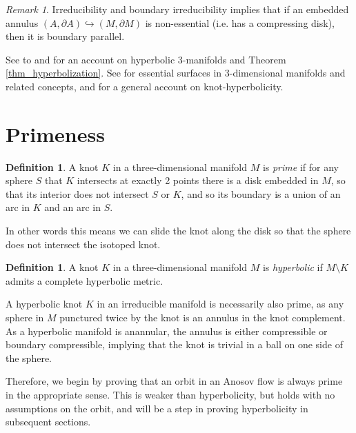 \documentclass[12pt]{amsart}
\theoremstyle{definition}
\newtheorem{definition}[theorem]{Definition}
\theoremstyle{remark}
\newtheorem{remark}[theorem]{Remark}
\begin{document}
\begin{remark}
Irreducibility and boundary irreducibility implies that if an embedded annulus $(A,\partial A)\hookrightarrow (M,\partial M)$ is non-essential (i.e. has a compressing disk), then it is boundary parallel.    
\end{remark}


See to \cite{ThurstonThreeDymensionalManifoldsKleinian} and \cite{kapovich2001hyperbolic} for an account on hyperbolic 3-manifolds and Theorem \ref{thm_hyperbolization}. See \cite{76Hempel3MfdsBook} for essential surfaces in 3-dimensional manifolds and related concepts, and \cite{Purcell_Knot_theory} for a general account on knot-hyperbolicity. 

\section{Primeness}
\label{sec:primeness}


\begin{definition}
A knot $K$ in a three-dimensional manifold $M$ is \emph{prime} if for any sphere $S$ that $K$ intersects at exactly 2 points there is a disk embedded in $M$, so that its interior does not intersect $S$ or $K$, and so its boundary is a union of an arc in $K$ and an arc in $S$. 
\end{definition}


In other words this means we can slide the knot along the
disk so that the sphere does not intersect the isotoped
knot. 

\begin{definition}
    A knot $K$ in a three-dimensional manifold $M$ is \emph{hyperbolic} if $M\setminus K$ admits a complete hyperbolic metric.
\end{definition}

A hyperbolic knot $K$ in an irreducible manifold is necessarily also prime, 
 as any sphere in $M$ punctured twice by the knot is an annulus in the knot complement. As a hyperbolic manifold is anannular, the annulus is either compressible or boundary compressible, implying that the knot is trivial in a ball on one side of the sphere. 
 
 Therefore, we begin by proving that an orbit in an Anosov flow is always prime in the appropriate sense. This is weaker than hyperbolicity, but holds with no assumptions on the orbit, and will be a step in proving hyperbolicity in subsequent sections.
\end{document}
